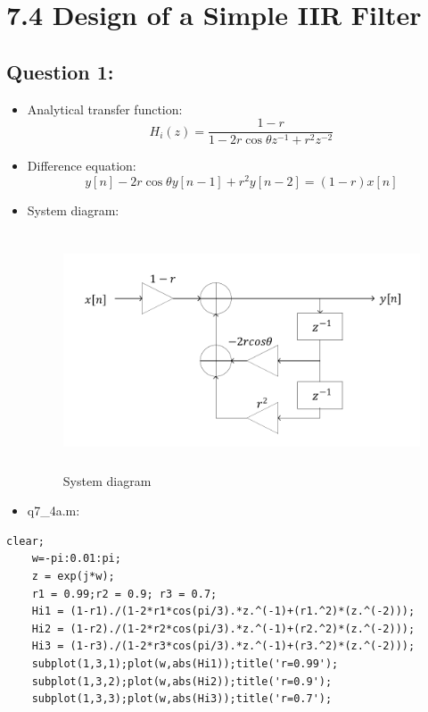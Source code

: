 \documentclass[onecolumn,oneside]{SUSTechHomework}
\begin{document}
\section*{7.4 Design of a Simple IIR Filter}
\subsection*{Question 1:}
\begin{itemize}
	\item Analytical transfer function:
	$$
	H_i(z)=\frac{1-r}{1-2r\cos\theta z^{-1}+r^2z^{-2}}
	$$
	\item Difference equation:
	$$
	y[n]-2 r \cos \theta y[n-1]+r^{2} y[n-2]=(1-r) x[n]
	$$
	\item System diagram:
	\begin{figure}[H]
		\centering
		\includegraphics[height=70mm]{pictures/框图2.pdf}
		\caption{System diagram}
	\end{figure}
	\item q7\_4a.m:
\end{itemize}
\begin{lstlisting}[title=q7\_4a.m]
	clear;
	w=-pi:0.01:pi;
	z = exp(j*w);
	r1 = 0.99;r2 = 0.9; r3 = 0.7;
	Hi1 = (1-r1)./(1-2*r1*cos(pi/3).*z.^(-1)+(r1.^2)*(z.^(-2)));
	Hi2 = (1-r2)./(1-2*r2*cos(pi/3).*z.^(-1)+(r2.^2)*(z.^(-2)));
	Hi3 = (1-r3)./(1-2*r3*cos(pi/3).*z.^(-1)+(r3.^2)*(z.^(-2)));
	subplot(1,3,1);plot(w,abs(Hi1));title('r=0.99');
	subplot(1,3,2);plot(w,abs(Hi2));title('r=0.9');
	subplot(1,3,3);plot(w,abs(Hi3));title('r=0.7');	
\end{lstlisting}
\end{document}
